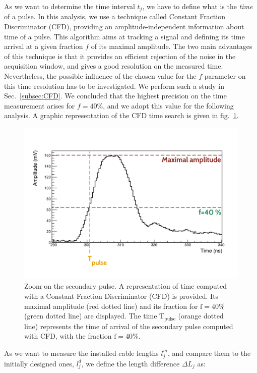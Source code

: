 As we want to determine the time interval $t_{j}$, we have to define what is the \emph{time} of a pulse.
In this analysis, we use a technique called Constant Fraction Discriminator (CFD), providing an amplitude-independent information about time of a pulse.
This algorithm aims at tracking a signal and defining its time arrival at a given fraction $f$ of its maximal amplitude.
The two main advantages of this technique is that it provides an efficient rejection of the noise in the acquisition window, and gives a good resolution on the measured time.
Nevertheless, the possible influence of the chosen value for the $f$ parameter on this time resolution has to be investigated.
We perform such a study in Sec.~\ref{subsec:CFD}.
We concluded that the highest precision on the time measurement arises for $f = 40\%$, and we adopt this value for the following analysis.
A graphic representation of the CFD time search is given in fig.~\ref{fig:CFD}.
\begin{figure}[h!]
  \centering
  \includegraphics[trim={1.2cm 1.5cm 1.7cm 3.1cm},clip,width=1\textwidth]{commissioning/fig_commissioning/CFD_example_zoom.pdf}
  \caption{ Zoom on the secondary pulse.
    A representation of time computed with a Constant Fraction Discriminator (CFD) is provided.
    Its maximal amplitude (red dotted line) and its fraction for $\text{f}=40\%$ (green dotted line) are displayed.
    The time $\text{T}_{\text{pulse}}$ (orange dotted line) represents the time of arrival of the secondary pulse computed with CFD, with the fraction $\text{f}=40\%$.
    \label{fig:CFD}}
\end{figure}
As we want to measure the installed cable lengths $l^{m}_{j}$, and compare them to the initially designed ones, $l^{d}_{j}$, we define the length difference $\Delta L_{j}$ as:
